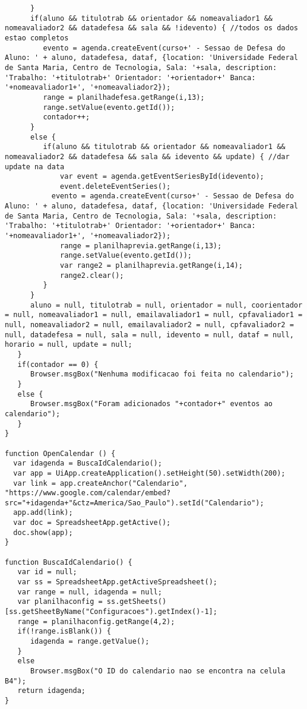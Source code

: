 \begin{lstlisting}
      }
      if(aluno && titulotrab && orientador && nomeavaliador1 && nomeavaliador2 && datadefesa && sala && !idevento) { //todos os dados estao completos
         evento = agenda.createEvent(curso+' - Sessao de Defesa do Aluno: ' + aluno, datadefesa, dataf, {location: 'Universidade Federal de Santa Maria, Centro de Tecnologia, Sala: '+sala, description: 'Trabalho: '+titulotrab+' Orientador: '+orientador+' Banca: '+nomeavaliador1+', '+nomeavaliador2});
         range = planilhadefesa.getRange(i,13);
         range.setValue(evento.getId());   
         contador++;
      }
      else { 
         if(aluno && titulotrab && orientador && nomeavaliador1 && nomeavaliador2 && datadefesa && sala && idevento && update) { //dar update na data
             var event = agenda.getEventSeriesById(idevento); 
             event.deleteEventSeries();
           evento = agenda.createEvent(curso+' - Sessao de Defesa do Aluno: ' + aluno, datadefesa, dataf, {location: 'Universidade Federal de Santa Maria, Centro de Tecnologia, Sala: '+sala, description: 'Trabalho: '+titulotrab+' Orientador: '+orientador+' Banca: '+nomeavaliador1+', '+nomeavaliador2});
             range = planilhaprevia.getRange(i,13);
             range.setValue(evento.getId());  
             var range2 = planilhaprevia.getRange(i,14);
             range2.clear();
         }
      }
      aluno = null, titulotrab = null, orientador = null, coorientador = null, nomeavaliador1 = null, emailavaliador1 = null, cpfavaliador1 = null, nomeavaliador2 = null, emailavaliador2 = null, cpfavaliador2 = null, datadefesa = null, sala = null, idevento = null, dataf = null, horario = null, update = null;
   }
   if(contador == 0) {
      Browser.msgBox("Nenhuma modificacao foi feita no calendario");
   }
   else { 
      Browser.msgBox("Foram adicionados "+contador+" eventos ao calendario");
   }
}

function OpenCalendar () {
  var idagenda = BuscaIdCalendario();
  var app = UiApp.createApplication().setHeight(50).setWidth(200);
  var link = app.createAnchor("Calendario", "https://www.google.com/calendar/embed?src="+idagenda+"&ctz=America/Sao_Paulo").setId("Calendario");
  app.add(link);  
  var doc = SpreadsheetApp.getActive();
  doc.show(app);
}

function BuscaIdCalendario() {
   var id = null;
   var ss = SpreadsheetApp.getActiveSpreadsheet();
   var range = null, idagenda = null;
   var planilhaconfig = ss.getSheets()[ss.getSheetByName("Configuracoes").getIndex()-1];
   range = planilhaconfig.getRange(4,2);
   if(!range.isBlank()) {
      idagenda = range.getValue();
   }  
   else 
      Browser.msgBox("O ID do calendario nao se encontra na celula B4");
   return idagenda;
}


\end{lstlisting}
